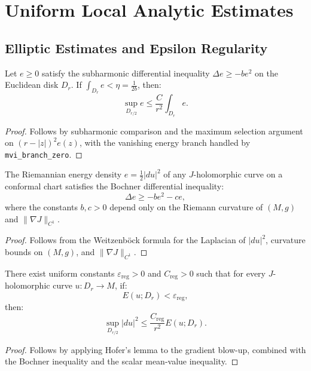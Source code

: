 \chapter{Uniform Local Analytic Estimates}

\section{Elliptic Estimates and Epsilon Regularity}

\begin{lemma}
\label{a01:mean_value}
\leanok
{}
Let $e \ge 0$ satisfy the subharmonic differential inequality $\Delta e \ge -b e^2$ on the Euclidean disk $D_r$. If $\int_{D_r} e < \eta = \frac{1}{2b}$, then:
\[
\sup_{D_{r/2}} e \le \frac{C}{r^2} \int_{D_r} e.
\]
\end{lemma}
\begin{proof}
Follows by subharmonic comparison and the maximum selection argument on $(r - |z|)^2 e(z)$, with the vanishing energy branch handled by \texttt{mvi\_branch\_zero}.
\end{proof}

\begin{lemma}
\label{a02:bochner}
\leanok
{}
The Riemannian energy density $e = \frac{1}{2}|du|^2$ of any $J$-holomorphic curve on a conformal chart satisfies the Bochner differential inequality:
\[
\Delta e \ge -b e^2 - c e,
\]
where the constants $b, c > 0$ depend only on the Riemann curvature of $(M, g)$ and $\|\nabla J\|_{C^1}$.
\end{lemma}
\begin{proof}
Follows from the Weitzenb\"ock formula for the Laplacian of $|du|^2$, curvature bounds on $(M, g)$, and $\|\nabla J\|_{C^1}$.
\end{proof}

\begin{theorem}
\label{a03:eps_regularity}
\leanok
{}
There exist uniform constants $\varepsilon_{\mathrm{reg}} > 0$ and $C_{\mathrm{reg}} > 0$ such that for every $J$-holomorphic curve $u : D_r \to M$, if:
\[
E(u; D_r) < \varepsilon_{\mathrm{reg}},
\]
then:
\[
\sup_{D_{r/2}} |du|^2 \le \frac{C_{\mathrm{reg}}}{r^2} E(u; D_r).
\]
\end{theorem}
\begin{proof}
Follows by applying Hofer's lemma to the gradient blow-up, combined with the Bochner inequality and the scalar mean-value inequality.
\end{proof}

